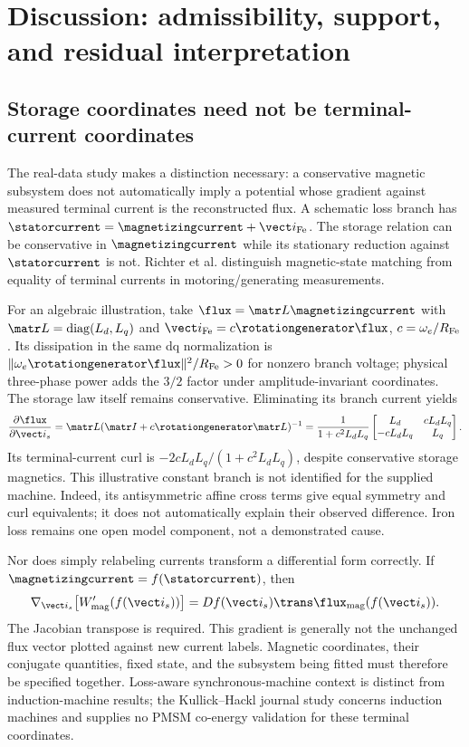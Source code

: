 \section{Discussion: admissibility, support, and residual interpretation}
\subsection{Storage coordinates need not be terminal-current coordinates}
The real-data study makes a distinction necessary: a conservative magnetic
subsystem does not automatically imply a potential whose gradient against
measured terminal current is the reconstructed flux. A schematic loss branch
has $\statorcurrent=\magnetizingcurrent+\vect i_{\rm Fe}$.
The storage relation can be conservative in $\magnetizingcurrent$ while its
stationary reduction against $\statorcurrent$ is not. Richter et al.
\cite{richter2014} distinguish magnetic-state matching from equality of
terminal currents in motoring/generating measurements.

For an algebraic illustration, take
$\flux=\matr L\magnetizingcurrent$ with
$\matr L=\operatorname{diag}(L_d,L_q)$ and
$\vect i_{\rm Fe}=c\rotationgenerator\flux$, $c=\omega_e/R_{\rm Fe}$.
Its dissipation in the same dq normalization is
$\|\omega_e\rotationgenerator\flux\|^2/R_{\rm Fe}>0$ for nonzero branch voltage;
physical three-phase power adds the $3/2$ factor under amplitude-invariant
coordinates. The storage law itself remains conservative. Eliminating its branch
current yields
\begin{equation}
 \frac{\partial\flux}{\partial\vect i_s}
 =\matr L(\matr I+c\rotationgenerator\matr L)^{-1}
 =\frac{1}{1+c^2L_dL_q}
 \begin{bmatrix}L_d&cL_dL_q\\-cL_dL_q&L_q\end{bmatrix}.
\end{equation}
Its terminal-current curl is $-2cL_dL_q/(1+c^2L_dL_q)$, despite conservative
storage magnetics. This illustrative constant branch is not identified for
the supplied machine. Indeed, its antisymmetric affine cross terms give
equal symmetry and curl equivalents; it does not automatically explain their
observed difference. Iron loss remains one open model component, not a
demonstrated cause.

Nor does simply relabeling currents transform a differential form correctly.
If $\magnetizingcurrent=f(\statorcurrent)$, then
\begin{equation}
 \nabla_{\vect i_s}\bigl[W'_{\rm mag}(f(\vect i_s))\bigr]
 =Df(\vect i_s)\trans\flux_{\rm mag}(f(\vect i_s)).
 \label{eq:current-pullback}
\end{equation}
The Jacobian transpose is required. This gradient is generally not the
unchanged flux vector plotted against new current labels. Magnetic coordinates,
their conjugate quantities, fixed state, and the subsystem being fitted must
therefore be specified together. Loss-aware synchronous-machine context is
distinct from induction-machine results; the Kullick--Hackl journal study
\cite{kullick2023} concerns induction machines and supplies no PMSM
co-energy validation for these terminal coordinates.

